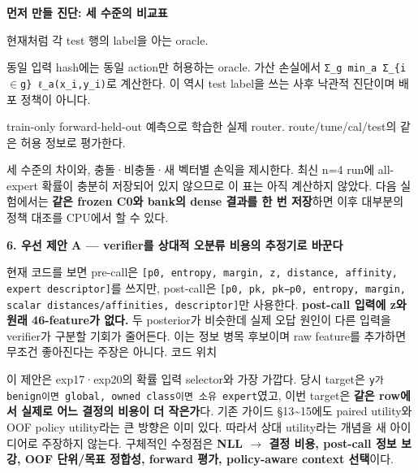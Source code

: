 \textbf{먼저 만들 진단: 세 수준의 비교표}

\par\noindent \textbullet\enspace 현재처럼 각 test 행의 label을 아는 oracle.


\par\noindent \textbullet\enspace 동일 입력 hash에는 동일 action만 허용하는 oracle. 가산 손실에서 \texttt{Σ\_\allowbreak{}\allowbreak{}g min\_\allowbreak{}\allowbreak{}a Σ\_\allowbreak{}\allowbreak{}\{\allowbreak{}i\ensuremath{\in}g\allowbreak{}\}\allowbreak{} ℓ\_\allowbreak{}\allowbreak{}a(x\_\allowbreak{}\allowbreak{}i,\allowbreak{}y\_\allowbreak{}\allowbreak{}i)}로 계산한다. 이 역시 test label을 쓰는 사후 낙관적 진단이며 배포 정책이 아니다.


\par\noindent \textbullet\enspace train-only forward-held-out 예측으로 학습한 실제 router. route/\allowbreak{}tune/\allowbreak{}cal/\allowbreak{}test의 같은 허용 정보로 평가한다.


세 수준의 차이와, 충돌·비충돌·새 벡터별 손익을 제시한다. 최신 n=\allowbreak{}4 run에 all-expert 확률이 충분히 저장되어 있지 않으므로 이 표는 아직 계산하지 않았다. 다음 실험에서는 \textbf{같은 frozen C0와 bank의 dense 결과를 한 번 저장}하면 이후 대부분의 정책 대조를 CPU에서 할 수 있다.

\textbf{6. 우선 제안 A — verifier를 상대적 오분류 비용의 추정기로 바꾼다}

현재 코드를 보면 pre-call은 \texttt{[p0,\allowbreak{} ent\allowbreak{}ropy,\allowbreak{} ma\allowbreak{}rgin,\allowbreak{} z,\allowbreak{} distanc\allowbreak{}e,\allowbreak{} affin\allowbreak{}ity,\allowbreak{} exp\allowbreak{}ert desc\allowbreak{}riptor]}를 쓰지만, post-call은 \texttt{[p0,\allowbreak{} pk,\allowbreak{} pk−p0,\allowbreak{} \allowbreak{}entropy,\allowbreak{} margin,\allowbreak{} scalar \allowbreak{}distance\allowbreak{}s/\allowbreak{}\allowbreak{}affini\allowbreak{}ties,\allowbreak{} de\allowbreak{}scriptor\allowbreak{}]}만 사용한다. \textbf{post-call 입력에 z와 원래 46-feature가 없다.} 두 posterior가 비슷한데 실제 오답 원인이 다른 입력을 verifier가 구분할 기회가 줄어든다. 이는 정보 병목 후보이며 raw feature를 추가하면 무조건 좋아진다는 주장은 아니다. 코드 위치

이 제안은 exp17·exp20의 확률 입력 selector와 가장 가깝다. 당시 target은 \texttt{y가 benig\allowbreak{}n이면 glob\allowbreak{}al,\allowbreak{} owne\allowbreak{}d class이\allowbreak{}면 소유 exp\allowbreak{}ert}였고, 이번 target은 \textbf{같은 row에서 실제로 어느 결정의 비용이 더 작은가}다. 기존 가이드 §13\textasciitilde{}15에도 paired utility와 OOF policy utility라는 큰 방향은 이미 있다. 따라서 상대 utility라는 개념을 새 아이디어로 주장하지 않는다. 구체적인 수정점은 \textbf{NLL \ensuremath{\rightarrow} 결정 비용, post-call 정보 보강, OOF 단위/\allowbreak{}목표 정합성, forward 평가, policy-aware context 선택}이다.

